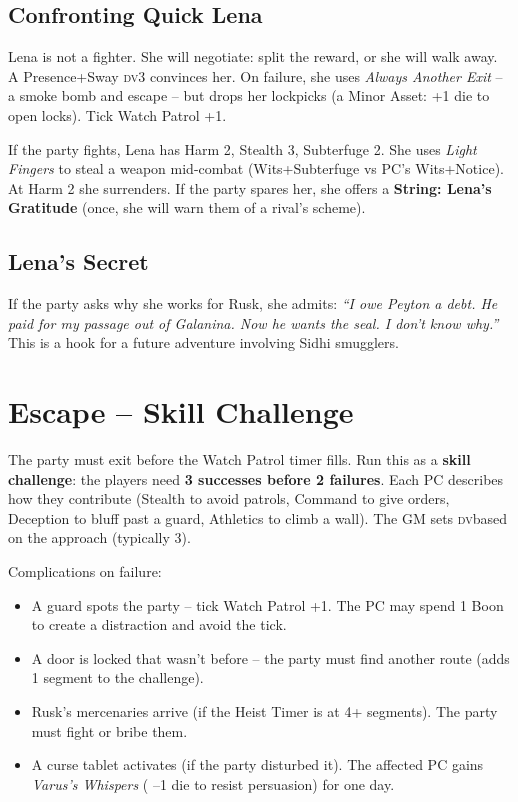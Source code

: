 \documentclass[10pt,twoside]{book}
\newcommand{\dv}{\textsc{dv}}
\begin{document}
\subsection{Confronting Quick Lena}

Lena is not a fighter. She will negotiate: split the reward, or she will walk away. A Presence+Sway \dv 3 convinces her. On failure, she uses \textit{Always Another Exit} -- a smoke bomb and escape -- but drops her lockpicks (a Minor Asset: +1 die to open locks). Tick Watch Patrol +1.

If the party fights, Lena has Harm 2, Stealth 3, Subterfuge 2. She uses \textit{Light Fingers} to steal a weapon mid-combat (Wits+Subterfuge vs PC's Wits+Notice). At Harm 2 she surrenders. If the party spares her, she offers a \textbf{String: Lena's Gratitude} (once, she will warn them of a rival's scheme).

\subsection{Lena's Secret}

If the party asks why she works for Rusk, she admits: \textit{``I owe Peyton a debt. He paid for my passage out of Galanina. Now he wants the seal. I don't know why.''} This is a hook for a future adventure involving Sidhi smugglers.

\section{Escape -- Skill Challenge}

The party must exit before the Watch Patrol timer fills. Run this as a \textbf{skill challenge}: the players need \textbf{3 successes before 2 failures}. Each PC describes how they contribute (Stealth to avoid patrols, Command to give orders, Deception to bluff past a guard, Athletics to climb a wall). The GM sets \dv based on the approach (typically 3).

Complications on failure:

\begin{itemize}
\item A guard spots the party -- tick Watch Patrol +1. The PC may spend 1 Boon to create a distraction and avoid the tick.
\item A door is locked that wasn't before -- the party must find another route (adds 1 segment to the challenge).
\item Rusk's mercenaries arrive (if the Heist Timer is at 4+ segments). The party must fight or bribe them.
\item A curse tablet activates (if the party disturbed it). The affected PC gains \textit{Varus's Whispers} ( --1 die to resist persuasion) for one day.
\end{itemize}
\end{document}
